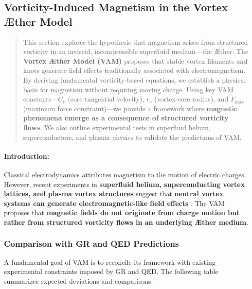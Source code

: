 
\subsection{Vorticity-Induced Magnetism in the Vortex Æther Model}


    \begin{abstract}
This section explores the hypothesis that magnetism arises from structured vorticity in an inviscid, incompressible superfluid medium—the Æther. The \textbf{Vortex Æther Model (VAM)} proposes that stable vortex filaments and knots generate field effects traditionally associated with electromagnetism. By deriving fundamental vorticity-based equations, we establish a physical basis for magnetism without requiring moving charge. Using key VAM constants—\( C_e \) (core tangential velocity), \( r_c \) (vortex-core radius), and \( F_{\max} \) (maximum force constraint)—we provide a framework where \textbf{magnetic phenomena emerge as a consequence of structured vorticity flows}.
    We also outline experimental tests in superfluid helium, superconductors, and plasma physics to validate the predictions of VAM.
    \end{abstract}

    \paragraph*{Introduction:}

Classical electrodynamics attributes magnetism to the motion of electric charges. However, recent experiments in \textbf{superfluid helium, superconducting vortex lattices, and plasma vortex structures} suggest that \textbf{neutral vortex systems can generate electromagnetic-like field effects} \cite{superfluid_he_interferometers}. The VAM proposes that \textbf{magnetic fields do not originate from charge motion but rather from structured vorticity flows in an underlying Æther medium}.

\subsubsection*{Comparison with GR and QED Predictions}
A fundamental goal of VAM is to reconcile its framework with existing experimental constraints imposed by GR and QED. The following table summarizes expected deviations and comparisons:

